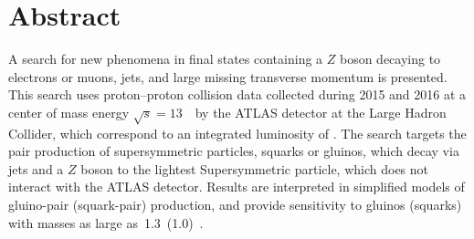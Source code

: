 


\begingroup
\let\clearpage\relax
\let\cleardoublepage\relax
\let\cleardoublepage\relax

\chapter*{Abstract}
A search for new phenomena in final states containing a $Z$ boson decaying to electrons or muons, jets, and large missing transverse momentum is presented. This search uses proton--proton collision data collected during 2015 and 2016 at a center of mass energy $\sqrt{s}=13$~\TeV\ by the ATLAS detector at the Large Hadron Collider, which correspond to an integrated luminosity of \lumi. The search targets the pair production of supersymmetric particles, squarks or gluinos, which decay via jets and a $Z$ boson to the lightest Supersymmetric particle, which does not interact with the ATLAS detector. Results are interpreted in simplified models of gluino-pair (squark-pair) production, and provide sensitivity to gluinos (squarks) with masses as large as~1.3~(1.0)~\TeV.

\endgroup			

\vfill